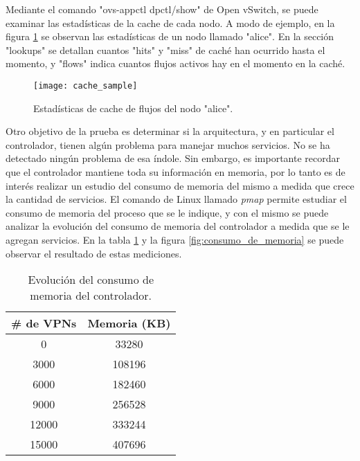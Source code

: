Mediante el comando "ovs-appctl dpctl/show" de Open vSwitch, se puede examinar las estadísticas de la cache de cada nodo. A modo de ejemplo, en la figura \ref{fig:cache_sample} se observan las estadísticas de un nodo llamado "alice". En la sección "lookups" se detallan cuantos "hits" y "miss" de caché han ocurrido hasta el momento, y "flows" indica cuantos flujos activos hay en el momento en la caché.

\begin{figure}[H]
	\caption{Estadísticas de cache de flujos del nodo "alice".}
	\texttt{[image: cache\_sample]}
	\centering
	\label{fig:cache_sample}
\end{figure}

Otro objetivo de la prueba es determinar si la arquitectura, y en particular el controlador, tienen algún problema para manejar muchos servicios. No se ha detectado ningún problema de esa índole. Sin embargo, es importante recordar que el controlador mantiene toda su información en memoria, por lo tanto es de interés realizar un estudio del consumo de memoria del mismo a medida que crece la cantidad de servicios. El comando de Linux llamado \textit{pmap} permite estudiar el consumo de memoria del proceso que se le indique, y con el mismo se puede analizar la evolución del consumo de memoria del controlador a medida que se le agregan servicios. En la tabla \ref{table:consumo_de_memoria} y la figura \ref{fig:consumo_de_memoria} se puede observar el resultado de estas mediciones. \\

\begin{table}[ht]
	\caption{Evolución del consumo de memoria del controlador.}
	\centering 
	\begin{tabular}{c c}
		\hline\hline
		\# de VPNs & Memoria (KB) \\ [0.5ex]
		\hline
		0 & 33280 \\
		3000 & 108196 \\
		6000 & 182460 \\
		9000 & 256528 \\
		12000 & 333244 \\
		15000 & 407696 \\ [1ex]
		\hline
	\end{tabular}
	\label{table:consumo_de_memoria}
\end{table}

